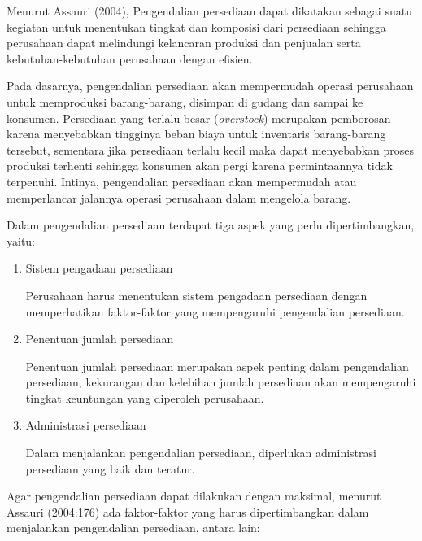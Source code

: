 Menurut Assauri (2004), Pengendalian persediaan dapat dikatakan sebagai suatu kegiatan untuk menentukan tingkat dan komposisi dari persediaan sehingga perusahaan dapat melindungi kelancaran produksi dan penjualan serta kebutuhan-kebutuhan perusahaan dengan efisien.

Pada dasarnya, pengendalian persediaan akan mempermudah operasi perusahaan untuk memproduksi barang-barang, disimpan di gudang dan sampai ke konsumen. Persediaan yang terlalu besar (\textit{overstock}) merupakan pemborosan karena menyebabkan tingginya beban biaya untuk inventaris barang-barang tersebut, sementara jika persediaan terlalu kecil maka dapat menyebabkan proses produksi terhenti sehingga konsumen akan pergi karena permintaannya tidak terpenuhi. Intinya, pengendalian persediaan akan mempermudah atau memperlancar jalannya operasi perusahaan dalam mengelola barang. 

Dalam pengendalian persediaan terdapat tiga aspek yang perlu dipertimbangkan, yaitu:

\begin{enumerate}
	\item Sistem pengadaan persediaan
	
	Perusahaan harus menentukan sistem pengadaan persediaan dengan memperhatikan faktor-faktor yang mempengaruhi pengendalian persediaan.

	\item Penentuan jumlah persediaan
	
	Penentuan jumlah persediaan merupakan aspek penting dalam pengendalian persediaan, kekurangan dan kelebihan jumlah persediaan akan mempengaruhi tingkat keuntungan yang diperoleh perusahaan.

	\item Administrasi persediaan
	
	Dalam menjalankan pengendalian persediaan, diperlukan administrasi persediaan yang baik dan teratur.
\end{enumerate}

Agar pengendalian persediaan dapat dilakukan dengan maksimal, menurut Assauri (2004:176) ada faktor-faktor yang harus dipertimbangkan dalam menjalankan pengendalian persediaan, antara lain:

